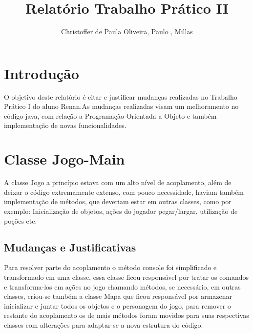 \documentclass[runningheads,a4paper]{llncs}
\begin{document}
\mainmatter 

\title{Relatório Trabalho Prático II}


\author{Christoffer de Paula Oliveira, Paulo , Millas}



\tocauthor{{}}

\maketitle

\medskip

\begingroup
\let\clearpage\relax
\tableofcontents
{}
\endgroup

\medskip
\medskip

\section*{Introdução}

O objetivo deste relatório é citar e justificar mudanças realizadas no Trabalho Prático I do aluno Renan.As mudanças realizadas visam um melhoramento no código java, com relação a Programação Orientada a Objeto e também implementação de novas funcionalidades.

\section{Classe Jogo-Main}

A classe Jogo a princípio estava com um alto nível de acoplamento, além de deixar o código extremamente extenso, com pouco necessidade, haviam também implementação de métodos, que deveriam estar em outras classes, como por exemplo: Inicialização de objetos, ações do jogador pegar/largar, utilização de poções etc.

\subsection{Mudanças e Justificativas}

Para resolver parte do acoplamento o método console foi simplificado e transformado em uma classe, essa classe ficou responsável por tratar os comandos e transforma-los em ações no jogo chamando métodos, se necessário, em outras classes, criou-se também a classe Mapa que ficou responsável por armazenar inicializar e juntar todos os objetos e o personagem do jogo, para remover o restante do acoplamento os de mais métodos foram movidos para suas respectivas classes com alterações para adaptar-se a nova estrutura do código.
\end{document}
